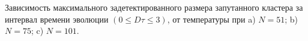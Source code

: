 Зависимость максимального задетектированного размера запутанного кластера
за интервал времени эволюции $(0 \leq D\tau \leq 3)$,
от температуры при  a) $N=51$; b) $N=75$; c) $N=101$.
